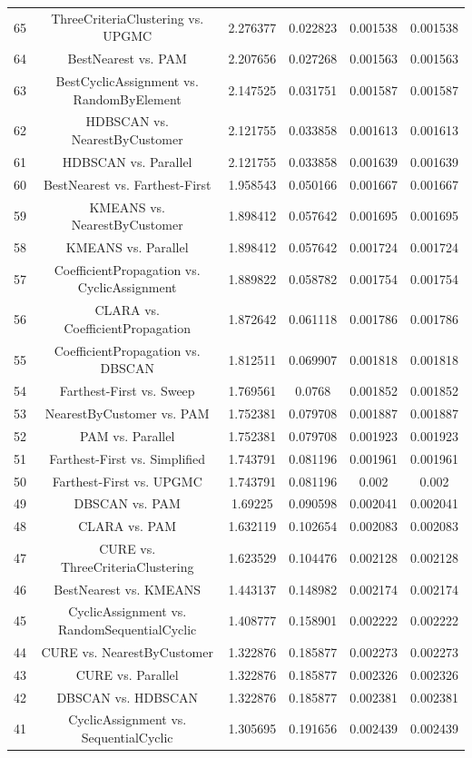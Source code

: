 \documentclass[a4paper,10pt]{article}
\begin{document}
\begin{landscape}
\begin{table}[!htp]
\begin{tabular}{cccccc}
65&ThreeCriteriaClustering vs. UPGMC&2.276377&0.022823&0.001538&0.001538\\
64&BestNearest vs. PAM&2.207656&0.027268&0.001563&0.001563\\
63&BestCyclicAssignment vs. RandomByElement&2.147525&0.031751&0.001587&0.001587\\
62&HDBSCAN vs. NearestByCustomer&2.121755&0.033858&0.001613&0.001613\\
61&HDBSCAN vs. Parallel&2.121755&0.033858&0.001639&0.001639\\
60&BestNearest vs. Farthest-First&1.958543&0.050166&0.001667&0.001667\\
59&KMEANS vs. NearestByCustomer&1.898412&0.057642&0.001695&0.001695\\
58&KMEANS vs. Parallel&1.898412&0.057642&0.001724&0.001724\\
57&CoefficientPropagation vs. CyclicAssignment&1.889822&0.058782&0.001754&0.001754\\
56&CLARA vs. CoefficientPropagation&1.872642&0.061118&0.001786&0.001786\\
55&CoefficientPropagation vs. DBSCAN&1.812511&0.069907&0.001818&0.001818\\
54&Farthest-First vs. Sweep&1.769561&0.0768&0.001852&0.001852\\
53&NearestByCustomer vs. PAM&1.752381&0.079708&0.001887&0.001887\\
52&PAM vs. Parallel&1.752381&0.079708&0.001923&0.001923\\
51&Farthest-First vs. Simplified&1.743791&0.081196&0.001961&0.001961\\
50&Farthest-First vs. UPGMC&1.743791&0.081196&0.002&0.002\\
49&DBSCAN vs. PAM&1.69225&0.090598&0.002041&0.002041\\
48&CLARA vs. PAM&1.632119&0.102654&0.002083&0.002083\\
47&CURE vs. ThreeCriteriaClustering&1.623529&0.104476&0.002128&0.002128\\
46&BestNearest vs. KMEANS&1.443137&0.148982&0.002174&0.002174\\
45&CyclicAssignment vs. RandomSequentialCyclic&1.408777&0.158901&0.002222&0.002222\\
44&CURE vs. NearestByCustomer&1.322876&0.185877&0.002273&0.002273\\
43&CURE vs. Parallel&1.322876&0.185877&0.002326&0.002326\\
42&DBSCAN vs. HDBSCAN&1.322876&0.185877&0.002381&0.002381\\
41&CyclicAssignment vs. SequentialCyclic&1.305695&0.191656&0.002439&0.002439\\

\end{tabular}
\end{table}
\end{landscape}
\end{document}
